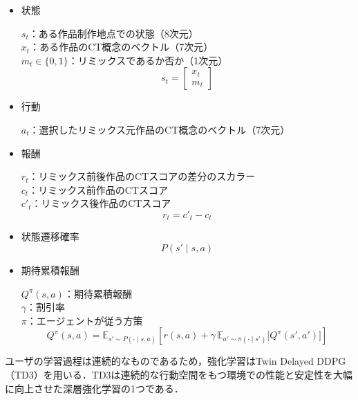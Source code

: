 \documentclass[submit,techrep,noauthor]{ipsj}
\begin{document}
\begin{itemize}
    \item 状態
        
        $s_t$：ある作品制作地点での状態（8次元）\\
        $x_t$：ある作品のCT概念のベクトル（7次元）\\
        $m_t\in\{0,1\}$：リミックスであるか否か（1次元）
        \begin{equation}
            s_t = 
            \begin{bmatrix}
               x_t \\
               m_t 
            \end{bmatrix}
        \end{equation}

    \item 行動

        $a_t$：選択したリミックス元作品のCT概念のベクトル（7次元）

    \item 報酬
    
        $r_t$：リミックス前後作品のCTスコアの差分のスカラー\\
        $c_t$：リミックス前作品のCTスコア\\
        $c'_t$：リミックス後作品のCTスコア
        \begin{equation}
            r_t = c'_t - c_t
        \end{equation}
    
    \item 状態遷移確率
        \begin{equation}
            P(s' \mid s, a)
        \end{equation}

    \item 期待累積報酬

        $Q^{\pi}(s, a)$：期待累積報酬\\
        $\gamma$：割引率\\        
        $\pi$：エージェントが従う方策
        \begin{equation}
            Q^{\pi}(s, a) = \mathbb{E}_{s' \sim P(\cdot \mid s, a)} 
            \left[ r(s, a) + \gamma \, 
            \mathbb{E}_{a' \sim \pi(\cdot \mid s')} 
            \big[ Q^{\pi}(s', a') \big] \right]
        \end{equation}

\end{itemize}

ユーザの学習過程は連続的なものであるため，強化学習はTwin Delayed DDPG（TD3）を用いる．TD3は連続的な行動空間をもつ環境での性能と安定性を大幅に向上させた深層強化学習の1つである\cite{fujimoto2018addressingfunctionapproximationerror}．
\end{document}
